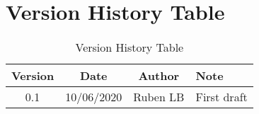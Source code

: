 \section{Version History Table}

\begin{table}[h]
	\centering
	\begin{tabular}{|c|c|c|l|}
		\hline
		Version & Date       & Author     & Note                                \\ \hline
		0.1     & 10/06/2020 & Ruben LB   & First draft                         \\ \hline
	\end{tabular}
	\caption{Version History Table}
	\label{tab:version-table}
\end{table}
